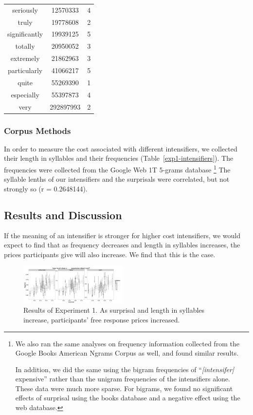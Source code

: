 \documentclass[10pt,letterpaper]{article}
\begin{document}
\begin{table}[ht]
\begin{center}
\begin{tabular}{ccc}
    seriously & 12570333 & 4 \\
    truly & 19778608 & 2 \\
    significantly & 19939125 & 5 \\
    totally & 20950052 & 3 \\
    extremely & 21862963 & 3 \\
    particularly & 41066217 & 5 \\
    quite & 55269390 & 1 \\
    especially & 55397873 & 4 \\
    very & 292897993 & 2
  \end{tabular}
 \end{center}
\end{table}

\subsubsection{Corpus Methods}

In order to measure the cost associated with different intensifiers, we collected their length in syllables and their frequencies (Table~\ref{exp1-intensifiers}).
The frequencies were collected from the Google Web 1T 5-grams database \cite{web1t5gram}\footnote{
We also ran the same analyses on frequency information collected from the Google Books American Ngrams Corpus \cite{books2011} as well, and found similar results.

In addition, we did the same using the bigram frequencies of ``\emph{[intensifer]} expensive'' rather than the unigram frequencies of the intensifiers alone. These data were much more sparse. For bigrams, we found no significant effects of surprisal using the books database and a negative effect using the web database.
}
The syllable lenths of our intensifiers and the surprisals were correlated, but not strongly so (r = 0.2648144).

\subsection{Results and Discussion}

If the meaning of an intensifier is stronger for higher cost intensifiers, we would expect to find that as frequency decreases and length in syllables increases, the prices participants give will also increase. We find that this is the case.

\begin{figure}[ht]
\begin{center}
\includegraphics[width=0.48\textwidth]{analysis_files_for_writeup/images/exp1-plot.png}
\end{center}
\caption{Results of Experiment 1. As surprisal and length in syllables increase, participants' free response prices increased.} 
\label{exp1-plot}
\end{figure}
\end{document}
